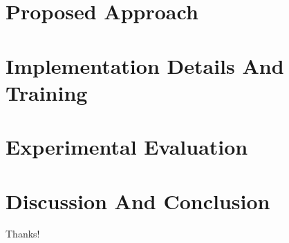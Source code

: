 \documentclass[aspectratio=169]{beamer}
\begin{document}
\section{Proposed Approach}


\section{Implementation Details And Training}


\section{Experimental Evaluation}


\section{Discussion And Conclusion}



\begin{frame}
    \begin{center}
        {\Huge\calligra Thanks!}
    \end{center}
\end{frame}
\end{document}
